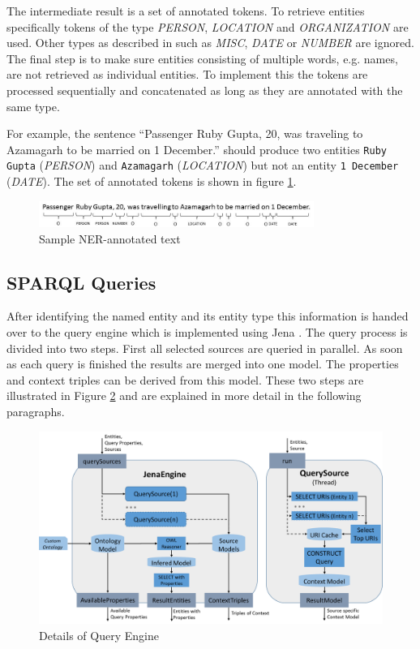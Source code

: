 The intermediate result is a set of annotated tokens. To retrieve entities specifically tokens of the type \textit{PERSON}, \textit{LOCATION} and \textit{ORGANIZATION} are used. Other types as described in \cite{CoreNLP_NER} such as \textit{MISC}, \textit{DATE} or \textit{NUMBER} are ignored. The final step is to make sure entities consisting of multiple words, e.g. names, are not retrieved as individual entities. To implement this the tokens are processed sequentially and concatenated as long as they are annotated with the same type. 

For example, the sentence ``Passenger Ruby Gupta, 20, was traveling to Azamagarh to be married on 1 December.'' should produce two entities \texttt{Ruby Gupta} (\textit{PERSON}) and \texttt{Azamagarh} (\textit{LOCATION}) but not an entity \texttt{1 December} (\textit{DATE}). The set of annotated tokens is shown in figure \ref{fig:nerExample}. 

 \begin{figure}[ht]
	\centering
	\includegraphics[width=0.8\textwidth]{img/nerExample}
	\caption{Sample NER-annotated text}
	\label{fig:nerExample}
\end{figure}
 




\subsection{SPARQL Queries}
\label{sec:sparqlQueries}
After identifying the named entity and its entity type this information is handed over to the query engine which is implemented using Jena \cite{apache_apache_2016}. The query process is divided into two steps. First all selected sources are queried in parallel. As soon as each query is finished the results are merged into one model. The properties and context triples can be derived from this model. These two steps are illustrated in Figure \ref{fig:details_query} and are explained in more detail in the following paragraphs.
\begin{figure}[ht]
	\centering
	\includegraphics[width=1\textwidth]{img/QueryEngineDetails}
	\caption{Details of Query Engine}
	\label{fig:details_query}
\end{figure}

